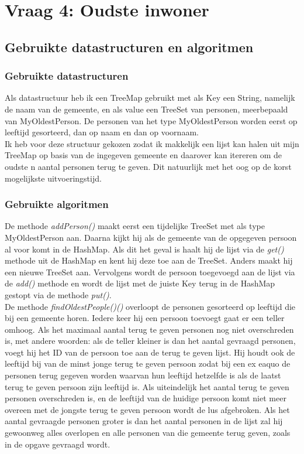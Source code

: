 \documentclass[10pt,a4paper]{report}
\begin{document}

\section*{Vraag 4: Oudste inwoner}
\subsection*{Gebruikte datastructuren en algoritmen}
\subsubsection*{Gebruikte datastructuren}
Als datastructuur heb ik een TreeMap gebruikt met als Key een String, namelijk de naam van de gemeente, en als value een TreeSet van personen, meerbepaald van MyOldestPerson. De personen van het type MyOldestPerson worden eerst op leeftijd gesorteerd, dan op naam en dan op voornaam.\\
Ik heb voor deze structuur gekozen zodat ik makkelijk een lijst kan halen uit mijn TreeMap op basis van de ingegeven gemeente en daarover kan itereren om de oudste n aantal personen terug te geven. Dit natuurlijk met het oog op de korst mogelijkste uitvoeringstijd.

\subsubsection*{Gebruikte algoritmen}
De methode \textsl{addPerson()} maakt eerst een tijdelijke TreeSet met als type MyOldestPerson aan. Daarna kijkt hij als de gemeente van de opgegeven persoon al voor komt in de HashMap. Als dit het geval is haalt hij de lijst via de \textsl{get()} methode uit de HashMap en kent hij deze toe aan de TreeSet. Anders maakt hij een nieuwe TreeSet aan. Vervolgens wordt de persoon toegevoegd aan de lijst via de \textsl{add()} methode en wordt de lijst met de juiste Key terug in de HashMap gestopt via de methode \textsl{put()}.\\

De methode \textsl{findOldestPeople()()} overloopt de personen gesorteerd op leeftijd die bij een gemeente horen. Iedere keer hij een persoon toevoegt gaat er een teller omhoog. Als het maximaal aantal terug te geven personen nog niet overschreden is, met andere woorden: als de teller kleiner is dan het aantal gevraagd personen, voegt hij het ID van de persoon toe aan de terug te geven lijst. Hij houdt ook de leeftijd bij van de minst jonge terug te geven persoon zodat bij een ex eaquo de personen terug gegeven worden waarvan hun leeftijd hetzelfde is als de laatst terug te geven persoon zijn leeftijd is. Als uiteindelijk het aantal terug te geven personen overschreden is, en de leeftijd van de huidige persoon komt niet meer overeen met de jongste terug te geven persoon wordt de lus afgebroken. Als het aantal gevraagde personen groter is dan het aantal personen in de lijst zal hij gewoonweg alles overlopen en alle personen van die gemeente terug geven, zoals in de opgave gevraagd wordt.
\end{document}
